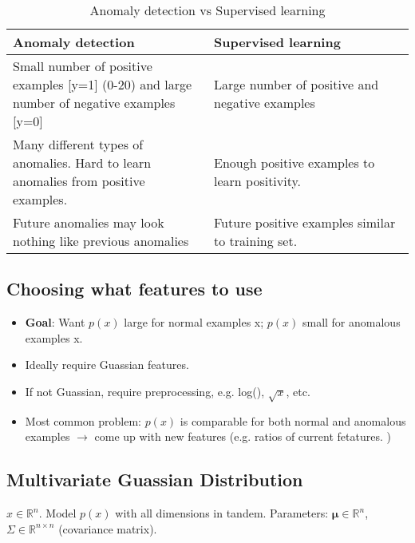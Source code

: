     \begin{table}[htpb]
            \centering
            \begin{tabular}{|p{0.5\linewidth}|p{0.5\linewidth}|}
                \hline
                Anomaly detection & Supervised learning \\
                \hline
                Small number of positive examples [y=1] (0-20) and large number of negative examples [y=0] & Large number of positive and negative examples \\
                \hline 
                Many different types of anomalies. Hard to learn anomalies from positive examples.  & Enough positive examples to learn positivity. \\
                \hline 
                Future anomalies may look nothing like previous anomalies & Future positive examples similar to training set.\\
                \hline
            \end{tabular}
            \caption{Anomaly detection vs Supervised learning}
            \label{tab:anomaly_detection_vs_supervised_learning}
        \end{table}
    
    \subsection{Choosing what features to use}
        \begin{itemize}
            \item \textbf{Goal}: Want $p(x)$ large for normal examples x; $p(x)$ small for anomalous examples x. 
            \item Ideally require Guassian features. 
            \item If not Guassian, require preprocessing, e.g. log(), $\sqrt{x}$, etc. 
            \item Most common problem: $p(x)$ is comparable for both normal and anomalous examples $\rightarrow$ come up with new features (e.g. ratios of current fetatures. )
        \end{itemize}
            
    \subsection{Multivariate Guassian Distribution}
        
    $x \in \mathbb{R}^n$. Model $p(x)$ with all dimensions in tandem. Parameters: $\boldsymbol{\mu} \in \mathbb{R}^n$, $\Sigma \in \mathbb{R}^{n \times n}$ (covariance matrix).
        
